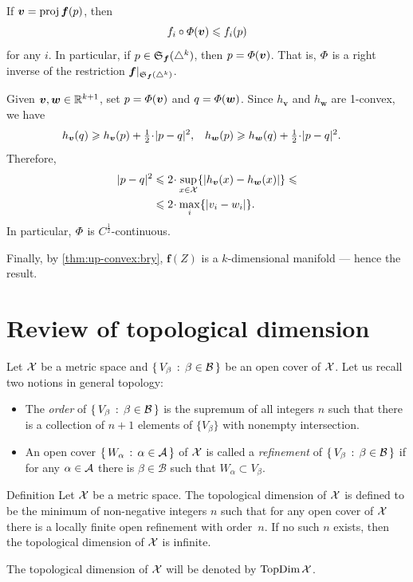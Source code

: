 If $\bm{v}=\operatorname{\rm proj}\nolimits \bm{f}(p)$, then 
\[f_i\circ \varPhi(\bm{v})\leqslant f_i(p)\]
for any $i$.
In particular, if $p\in \mathfrak{S}_{\bm{f}}(\triangle^k)$, then $p=\varPhi(\bm{v})$.
That is, $\varPhi$ is a right inverse of the restriction $\bm{f}|_{\mathfrak{S}_{\bm{f}}(\triangle^k)}$.

Given $\bm{v},\bm{w}\in\mathbb{R}^{k+1}$,
set $p=\varPhi (\bm{v})$ and $q=\varPhi (\bm{w})$.
Since $h_{\bm{v}}$ and $h_{\bm{w}}$ are 1-convex, we have
\begin{align*}
h_{\bm{v}}(q)
&\ge 
h_{\bm{v}}(p)+\tfrac{1}{2}\cdot\dist[2]{p}{q}{},
&
h_{\bm{w}}(p)
&\ge 
h_{\bm{w}}(q)+\tfrac{1}{2}\cdot\dist[2]{p}{q}{}.
\end{align*}
Therefore,
\begin{align*}
\dist[2]{p}{q}{}
&\le 
2\cdot\sup_{x\in\spc{X}}\{ |h_{\bm{v}}(x)-h_{\bm{w}}(x)| \}
\le
\\
&\le 
2\cdot\max_{i}\{|v_i-w_i|\}.
\end{align*}
In particular,
$\varPhi$ is $C^{\frac{1}{2}}$-continuous.

Finally, by \ref{thm:up-convex:bry}, $\bm{f}(Z)$ is a $k$-dimensional manifold --- hence the result.
\qeds

\section{Review of topological dimension}

Let $\mathcal{X}$ be a metric space and $\left\{\,{V_\beta}\,:\,{\beta\in\mathcal{B}}\,\right\}$
 be an open cover of $\mathcal{X}$.
Let us recall two notions in general topology:
\begin{itemize}

\item The \emph{order} of $\left\{\,{V_\beta}\,:\,{\beta\in\mathcal{B}}\,\right\}$ is the supremum of all integers $n$ such that there is a collection of $n+1$ elements of $\{V_\beta\}$ with nonempty intersection.

\item An open cover $\left\{\,{W_\alpha}\,:\,{\alpha\in\mathcal{A}}\,\right\}$ of $\mathcal{X}$ is called a \emph{refinement} of $\left\{\,{V_\beta}\,:\,{\beta\in\mathcal{B}}\,\right\}$ if for any $\alpha\in\mathcal{A}$ there is $\beta\in\mathcal{B}$ such that $W_\alpha\subset V_\beta$.

\end{itemize}

\begin{thm}{Definition}\label{def:TopDim}
Let $\mathcal{X}$ be a metric space. 
The topological dimension of $\mathcal{X}$ is defined to be the minimum of non-negative integers $n$
such that for any open cover of $\mathcal{X}$ there is a locally finite open refinement with order~$n$.
If no such $n$ exists, then the topological dimension of $\mathcal{X}$ is infinite.

The topological dimension of $\mathcal{X}$ will be denoted by $\mathop{\rm TopDim}\nolimits\mathcal{X}$.
\end{thm}

